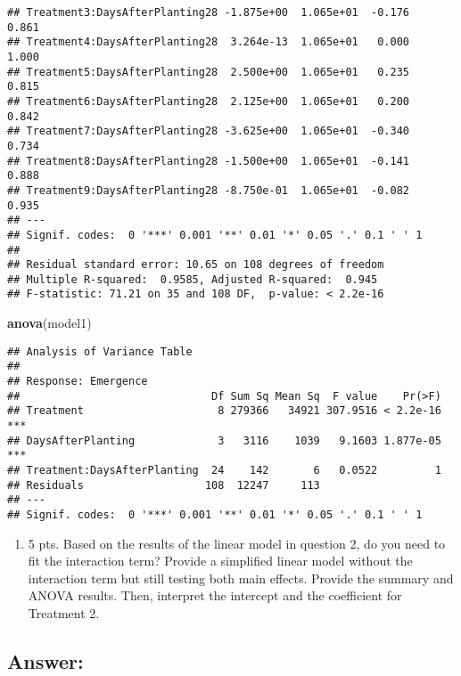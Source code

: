 \documentclass[
]{article}
\newenvironment{Shaded}{\begin{snugshade}}{\end{snugshade}}
\newcommand{\FunctionTok}[1]{\textcolor[rgb]{0.13,0.29,0.53}{\textbf{#1}}}
\newcommand{\NormalTok}[1]{#1}
\providecommand{\tightlist}{%
  \setlength{\itemsep}{0pt}\setlength{\parskip}{0pt}}
\begin{document}
\begin{verbatim}
## Treatment3:DaysAfterPlanting28 -1.875e+00  1.065e+01  -0.176    0.861    
## Treatment4:DaysAfterPlanting28  3.264e-13  1.065e+01   0.000    1.000    
## Treatment5:DaysAfterPlanting28  2.500e+00  1.065e+01   0.235    0.815    
## Treatment6:DaysAfterPlanting28  2.125e+00  1.065e+01   0.200    0.842    
## Treatment7:DaysAfterPlanting28 -3.625e+00  1.065e+01  -0.340    0.734    
## Treatment8:DaysAfterPlanting28 -1.500e+00  1.065e+01  -0.141    0.888    
## Treatment9:DaysAfterPlanting28 -8.750e-01  1.065e+01  -0.082    0.935    
## ---
## Signif. codes:  0 '***' 0.001 '**' 0.01 '*' 0.05 '.' 0.1 ' ' 1
## 
## Residual standard error: 10.65 on 108 degrees of freedom
## Multiple R-squared:  0.9585, Adjusted R-squared:  0.945 
## F-statistic: 71.21 on 35 and 108 DF,  p-value: < 2.2e-16
\end{verbatim}

\begin{Shaded}
\begin{Highlighting}[]
\FunctionTok{anova}\NormalTok{(model1)}
\end{Highlighting}
\end{Shaded}

\begin{verbatim}
## Analysis of Variance Table
## 
## Response: Emergence
##                              Df Sum Sq Mean Sq  F value    Pr(>F)    
## Treatment                     8 279366   34921 307.9516 < 2.2e-16 ***
## DaysAfterPlanting             3   3116    1039   9.1603 1.877e-05 ***
## Treatment:DaysAfterPlanting  24    142       6   0.0522         1    
## Residuals                   108  12247     113                       
## ---
## Signif. codes:  0 '***' 0.001 '**' 0.01 '*' 0.05 '.' 0.1 ' ' 1
\end{verbatim}

\begin{enumerate}
\def\labelenumi{\arabic{enumi}.}
\setcounter{enumi}{2}
\tightlist
\item
  5 pts. Based on the results of the linear model in question 2, do you
  need to fit the interaction term? Provide a simplified linear model
  without the interaction term but still testing both main effects.
  Provide the summary and ANOVA results. Then, interpret the intercept
  and the coefficient for Treatment 2.
\end{enumerate}

\subsection{Answer:}\label{answer}
\end{document}
